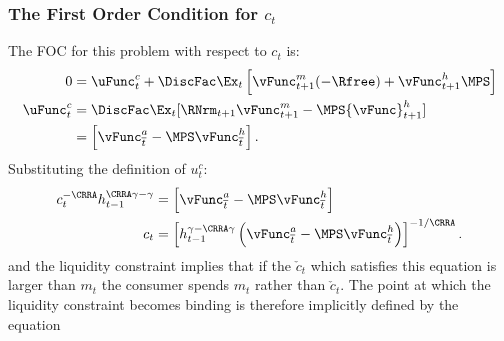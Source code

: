 \documentclass[titlepage, headings=optiontotocandhead]{\econtex}
\begin{document}
{  \subsubsection{The First Order Condition for ${c}_{t}$}
  The FOC for this problem with respect to ${c}_{t}$ is:
  \begin{equation}\begin{gathered}\begin{aligned}
        0  & = \uFunc^{c}_{t} + \DiscFac \Ex_{t} \left[{\vFunc}^{m}_{t+1}(-\Rfree)+{\vFunc}^{h}_{t+1} \MPS\right]  \\
        \uFunc^{c}_{t}  & = \DiscFac \Ex_{t} [\RNrm_{t+1} {\vFunc}_{t+1}^{m}-\MPS {\vFunc}_{t+1}^{h}] \label{eq:ctfoc}
        \\            & = \left[\vEOPt^{{a}}-\MPS \vEOPt^{h} \right].
      \end{aligned}\end{gathered}\end{equation}
  Substituting the definition of $u_{t}^{c}$:
  \begin{equation}\begin{gathered}\begin{aligned}
        {c}_{t}^{-\CRRA}h_{t-1}^{\CRRA\gamma-\gamma}  & = \left[\vEOPt^{{a}}-\MPS \vEOPt^{h} \right]
        \\  {c}_{t}                                     & = \left[h_{t-1}^{\gamma-\CRRA\gamma} \left(\vEOPt^{{a}}-\MPS \vEOPt^{h} \right) \right]^{-1/\CRRA} \label{eq:habitsfoc}.
      \end{aligned}\end{gathered}\end{equation}
  and the liquidity constraint implies that if the $\check{c}_{t}$ which
  satisfies this equation is larger than ${m}_{t}$ the consumer spends
  ${m}_{t}$ rather than $\check{c}_{t}$.  The point at which the liquidity
  constraint becomes binding is therefore implicitly defined by the equation
}
\end{document}
